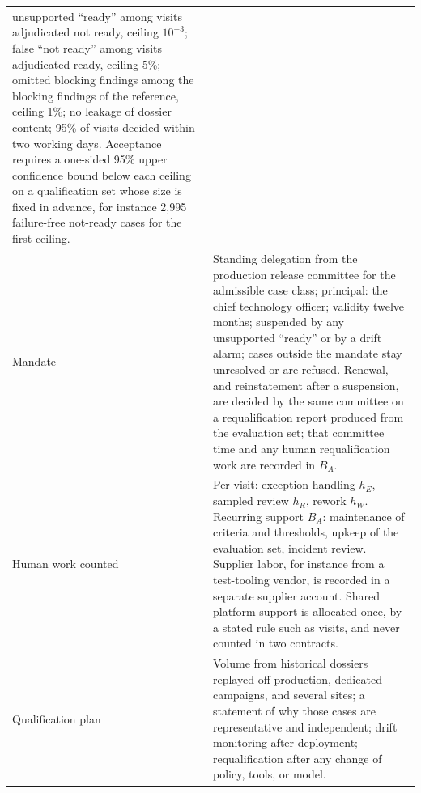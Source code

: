 \begin{table}[!htb]
\begin{tabularx}{\linewidth}{@{}P{3.2cm}L@{}}
unsupported ``ready'' among visits adjudicated not ready, ceiling $10^{-3}$; false ``not ready'' among
visits adjudicated ready, ceiling 5\%; omitted blocking findings among the blocking findings of the
reference, ceiling 1\%; no leakage of dossier content; 95\% of visits decided within two working days.
Acceptance requires a one-sided 95\% upper confidence bound below each ceiling on a qualification set
whose size is fixed in advance, for instance 2,995 failure-free not-ready cases for the first
ceiling.\\
Mandate & Standing delegation from the production release committee for the admissible case class;
principal: the chief technology officer; validity twelve months; suspended by any unsupported ``ready''
or by a drift alarm; cases outside the mandate stay unresolved or are refused. Renewal, and
reinstatement after a suspension, are decided by the same committee on a requalification report
produced from the evaluation set; that committee time and any human requalification work are recorded
in $B_A$.\\
Human work counted & Per visit: exception handling $h_E$, sampled review $h_R$, rework $h_W$. Recurring
support $B_A$: maintenance of criteria and thresholds, upkeep of the evaluation set, incident review.
Supplier labor, for instance from a test-tooling vendor, is recorded in a separate supplier account.
Shared platform support is allocated once, by a stated rule such as visits, and never counted in two
contracts.\\
Qualification plan & Volume from historical dossiers replayed off production, dedicated campaigns, and
several sites; a statement of why those cases are representative and independent; drift monitoring
after deployment; requalification after any change of policy, tools, or model.\\
\bottomrule
\end{tabularx}
\end{table}
